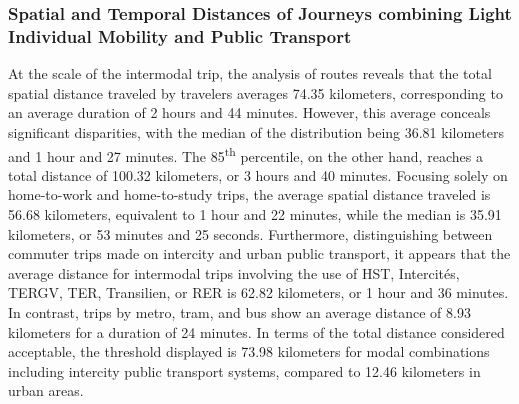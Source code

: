 \begin{refsegment}
\subsubsection*{Spatial and Temporal Distances of Journeys combining Light Individual Mobility and Public Transport
    \label{chap5:distances-totales}
    }

At the scale of the intermodal trip, the analysis of routes reveals that the total spatial distance traveled by travelers averages 74.35 kilometers, corresponding to an average duration of 2 hours and 44 minutes. However, this average conceals significant disparities, with the median of the distribution being 36.81 kilometers and 1 hour and 27 minutes. The 85\textsuperscript{th} percentile, on the other hand, reaches a total distance of 100.32 kilometers, or 3 hours and 40 minutes. Focusing solely on home-to-work and home-to-study trips, the average spatial distance traveled is 56.68 kilometers, equivalent to 1 hour and 22 minutes, while the median is 35.91 kilometers, or 53 minutes and 25 seconds. Furthermore, distinguishing between commuter trips made on intercity and urban public transport, it appears that the average distance for intermodal trips involving the use of \acrshort{HST}, Intercités, \acrshort{TERGV}, \acrshort{TER}, Transilien, or \acrfull{RER} is 62.82 kilometers, or 1 hour and 36 minutes. In contrast, trips by metro, tram, and bus show an average distance of 8.93 kilometers for a duration of 24 minutes. In terms of the total distance considered acceptable, the threshold displayed is 73.98 kilometers for modal combinations including intercity public transport systems, compared to 12.46 kilometers in urban areas.%
  

\end{refsegment}
